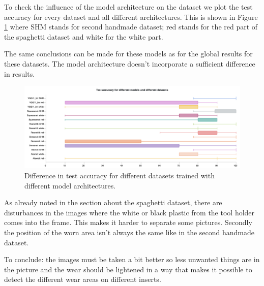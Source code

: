 	To check the influence of the model architecture on the dataset we plot the test accuracy for every dataset and all different architectures. This is shown in Figure \ref{fig:res:comp:ta:arch} where SHM stands for second handmade dataset; red stands for the red part of the spaghetti dataset and white for the white part.
	
	The same conclusions can be made for these models as for the global results for these datasets. The model architecture doesn't incorporate a sufficient difference in results. 

	\begin{figure}[hbtp]
		\centering
		\includegraphics[width=\linewidth]{fig/results/wandb/spaghetti_vs_secondhandmade/charts/Section-4-Panel-0-u37bm4h79}
		\caption{Difference in test accuracy for different datasets trained with different model architectures.}
		\label{fig:res:comp:ta:arch}
	\end{figure}

As already noted in the section about the spaghetti dataset, there are disturbances in the images where the white or black plastic from the tool holder comes into the frame. This makes it harder to separate some pictures. Secondly the position of the worn area isn't always the same like in the second handmade dataset. 

To conclude: the images must be taken a bit better so less unwanted things are in the picture and the wear should be lightened in a way that makes it possible to detect the different wear areas on different inserts.

